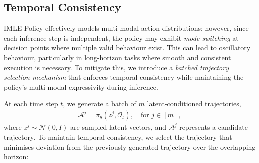 

\subsection{Temporal Consistency}

IMLE Policy effectively models multi-modal action distributions; however, since each inference step is independent, the policy may exhibit \textit{mode-switching} at decision points where multiple valid behaviour exist. This can lead to oscillatory behaviour, particularly in long-horizon tasks where smooth and consistent execution is necessary. To mitigate this, we introduce a \textit{batched trajectory selection mechanism} that enforces temporal consistency while maintaining the policy’s multi-modal expressivity during inference.  

At each time step \( t \), we generate a batch of \( m \) latent-conditioned trajectories,  
\begin{align}
\mathcal{A}^j = \pi_\theta(z^j, \mathcal{O}_t), \quad \text{for } j \in [m],
\end{align}
\noindent where \( z^j \sim \mathcal{N}(0, I) \) are sampled latent vectors, and \( \mathcal{A}^j \) represents a candidate trajectory. To maintain temporal consistency, we select the trajectory that minimises deviation from the previously generated trajectory over the overlapping horizon:

